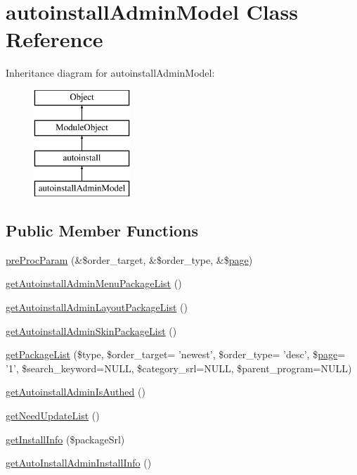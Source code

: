 \hypertarget{classautoinstallAdminModel}{\section{autoinstall\+Admin\+Model Class Reference}
\label{classautoinstallAdminModel}
}
Inheritance diagram for autoinstall\+Admin\+Model\+:\begin{figure}[H]
\begin{center}
\leavevmode
\includegraphics[height=4.000000cm]{classautoinstallAdminModel}
\end{center}
\end{figure}
\subsection*{Public Member Functions}
\begin{DoxyCompactItemize}
\item 
\hyperlink{classautoinstallAdminModel_a614c3051b3e9abff8c17dfc0664d6da5}{pre\+Proc\+Param} (\&\$order\+\_\+target, \&\$order\+\_\+type, \&\$\hyperlink{classpage}{page})
\item 
\hyperlink{classautoinstallAdminModel_a9cb4da298ab863dec8b7664cac2e42a5}{get\+Autoinstall\+Admin\+Menu\+Package\+List} ()
\item 
\hyperlink{classautoinstallAdminModel_a3892c760f1b77e23fdb38a9784cf0ec2}{get\+Autoinstall\+Admin\+Layout\+Package\+List} ()
\item 
\hyperlink{classautoinstallAdminModel_aee0002dcda8a05d57f8f7e5304be087c}{get\+Autoinstall\+Admin\+Skin\+Package\+List} ()
\item 
\hyperlink{classautoinstallAdminModel_a908daae5c3fb3b9c1c58f6ecf9dcd78f}{get\+Package\+List} (\$type, \$order\+\_\+target= 'newest', \$order\+\_\+type= 'desc', \$\hyperlink{classpage}{page}= '1', \$search\+\_\+keyword=N\+U\+L\+L, \$category\+\_\+srl=N\+U\+L\+L, \$parent\+\_\+program=N\+U\+L\+L)
\item 
\hyperlink{classautoinstallAdminModel_ac0b475b5969fded7a56103ba2e1fa710}{get\+Autoinstall\+Admin\+Is\+Authed} ()
\item 
\hyperlink{classautoinstallAdminModel_a6bba9a390c1274bc3c39a39310781b01}{get\+Need\+Update\+List} ()
\item 
\hyperlink{classautoinstallAdminModel_a8824834dd97b7e69b74af51778d27ed6}{get\+Install\+Info} (\$package\+Srl)
\item 
\hyperlink{classautoinstallAdminModel_ad6d50fbb755d2b48cdbd4269a1d1e404}{get\+Auto\+Install\+Admin\+Install\+Info} ()
\end{DoxyCompactItemize}
